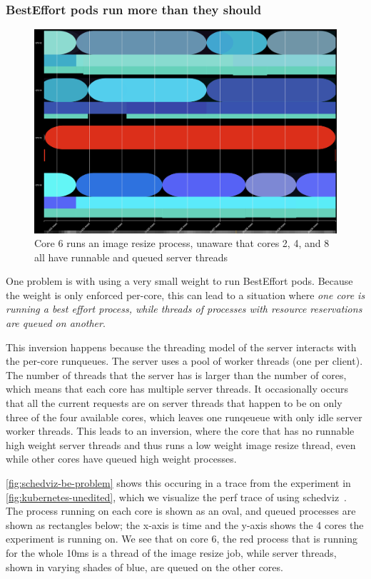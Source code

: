 \subsubsection{BestEffort pods run more than they should}

\begin{figure}[t]
    \centering
    \includegraphics[width=\columnwidth]{graphs/schedviz-be-problem.png}
    \caption{Core 6 runs an image resize process, unaware that cores 2, 4, and 8
    all have runnable and queued server threads}\label{fig:schedviz-be-problem}
\end{figure}

One problem is with using a very small weight to run BestEffort pods. Because
the weight is only enforced per-core, this can lead to a situation where
\textit{one core is running a best effort process, while threads of processes
with resource reservations are queued on another}. 

This inversion happens because the threading model of the server interacts with
the per-core runqueues. The server uses a pool of worker threads (one per
client). The number of threads that the server has is larger than the number of
cores, which means that each core has multiple server threads. It occasionally
occurs that all the current requests are on server threads that happen to be on
only three of the four available cores, which leaves one runqeueue with only
idle server worker threads. This leads to an inversion, where the core that has
no runnable high weight server threads and thus runs a low weight image resize
thread, even while other cores have queued high weight processes.

\autoref{fig:schedviz-be-problem} shows this occuring in a trace from the
experiment in \autoref{fig:kubernetes-unedited}, which we visualize the perf
trace of using schedviz~\cite{schedviz-tool}. The process running on each core
is shown as an oval, and queued processes are shown as rectangles below; the
x-axis is time and the y-axis shows the 4 cores the experiment is running on. We
see that on core 6, the red process that is running for the whole 10ms is a
thread of the image resize job, while server threads, shown in varying shades of
blue, are queued on the other cores. 


